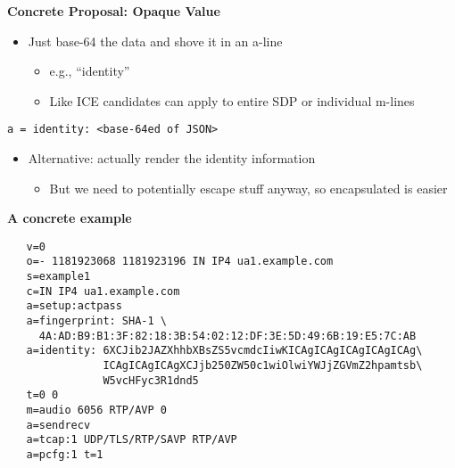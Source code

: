 \documentclass[helvetica]{seminar}
\newcommand{\heading}[1]{%
  \begin{center} 
    \large\bf 
    #1 
  \end{center} 
  \vspace{.4 in}}
\begin{document}
\begin{slide}
\heading{Concrete Proposal: Opaque Value}

\begin{itemize}
\item Just base-64 the data and shove it in an a-line
  \begin{itemize}
  \item e.g., ``identity''
  \item Like ICE candidates can apply to entire SDP or individual m-lines
  \end{itemize}
\end{itemize}

\begin{verbatim}
a = identity: <base-64ed of JSON>
\end{verbatim}

\begin{itemize}
\item Alternative: actually render the identity information
  \begin{itemize}
  \item But we need to potentially escape stuff anyway, so encapsulated is easier
  \end{itemize}
\end{itemize}
\end{slide}



\begin{slide}
\heading{A concrete example}

{\footnotesize
\begin{verbatim}
   v=0
   o=- 1181923068 1181923196 IN IP4 ua1.example.com
   s=example1
   c=IN IP4 ua1.example.com
   a=setup:actpass
   a=fingerprint: SHA-1 \
     4A:AD:B9:B1:3F:82:18:3B:54:02:12:DF:3E:5D:49:6B:19:E5:7C:AB
   a=identity: 6XCJib2JAZXhhbXBsZS5vcmdcIiwKICAgICAgICAgICAgICAg\
               ICAgICAgICAgXCJjb250ZW50c1wiOlwiYWJjZGVmZ2hpamtsb\
               W5vcHFyc3R1dnd5
   t=0 0
   m=audio 6056 RTP/AVP 0
   a=sendrecv
   a=tcap:1 UDP/TLS/RTP/SAVP RTP/AVP
   a=pcfg:1 t=1
\end{verbatim}
}
\end{slide}
\end{document}
